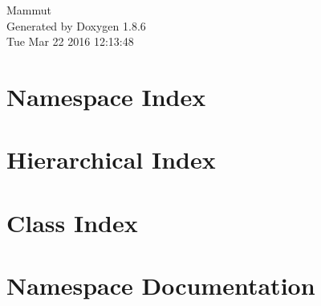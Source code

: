 \documentclass[twoside]{book}
\newcommand{\clearemptydoublepage}{%
  \newpage{\pagestyle{empty}\cleardoublepage}%
}
\begin{document}
\hypersetup{pageanchor=false}
\begin{titlepage}
\vspace*{7cm}
\begin{center}%
{\Large Mammut }\\
\vspace*{1cm}
{\large Generated by Doxygen 1.8.6}\\
\vspace*{0.5cm}
{\small Tue Mar 22 2016 12:13:48}\\
\end{center}
\end{titlepage}
\clearemptydoublepage
\tableofcontents
\clearemptydoublepage
{}
\hypersetup{pageanchor=true}

\chapter{Namespace Index}

\chapter{Hierarchical Index}

\chapter{Class Index}

\chapter{Namespace Documentation}

\end{document}

